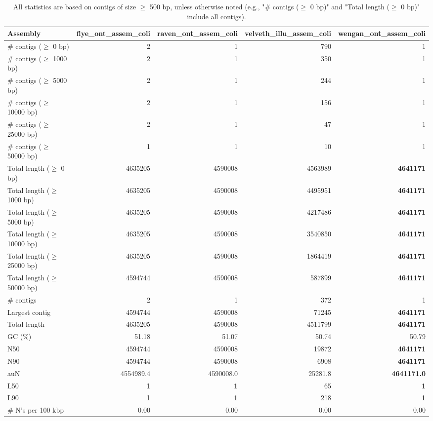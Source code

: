 \documentclass[12pt,a4paper]{article}
\begin{document}
\begin{table}[ht]
\begin{center}
\caption{All statistics are based on contigs of size $\geq$ 500 bp, unless otherwise noted (e.g., "\# contigs ($\geq$ 0 bp)" and "Total length ($\geq$ 0 bp)" include all contigs).}
\begin{tabular}{|l*{4}{|r}|}
\hline
Assembly & flye\_ont\_assem\_coli & raven\_ont\_assem\_coli & velveth\_illu\_assem\_coli & wengan\_ont\_assem\_coli \\ \hline
\# contigs ($\geq$ 0 bp) & 2 & 1 & 790 & 1 \\ \hline
\# contigs ($\geq$ 1000 bp) & 2 & 1 & 350 & 1 \\ \hline
\# contigs ($\geq$ 5000 bp) & 2 & 1 & 244 & 1 \\ \hline
\# contigs ($\geq$ 10000 bp) & 2 & 1 & 156 & 1 \\ \hline
\# contigs ($\geq$ 25000 bp) & 2 & 1 & 47 & 1 \\ \hline
\# contigs ($\geq$ 50000 bp) & 1 & 1 & 10 & 1 \\ \hline
Total length ($\geq$ 0 bp) & 4635205 & 4590008 & 4563989 & {\bf 4641171} \\ \hline
Total length ($\geq$ 1000 bp) & 4635205 & 4590008 & 4495951 & {\bf 4641171} \\ \hline
Total length ($\geq$ 5000 bp) & 4635205 & 4590008 & 4217486 & {\bf 4641171} \\ \hline
Total length ($\geq$ 10000 bp) & 4635205 & 4590008 & 3540850 & {\bf 4641171} \\ \hline
Total length ($\geq$ 25000 bp) & 4635205 & 4590008 & 1864419 & {\bf 4641171} \\ \hline
Total length ($\geq$ 50000 bp) & 4594744 & 4590008 & 587899 & {\bf 4641171} \\ \hline
\# contigs & 2 & 1 & 372 & 1 \\ \hline
Largest contig & 4594744 & 4590008 & 71245 & {\bf 4641171} \\ \hline
Total length & 4635205 & 4590008 & 4511799 & {\bf 4641171} \\ \hline
GC (\%) & 51.18 & 51.07 & 50.74 & 50.79 \\ \hline
N50 & 4594744 & 4590008 & 19872 & {\bf 4641171} \\ \hline
N90 & 4594744 & 4590008 & 6908 & {\bf 4641171} \\ \hline
auN & 4554989.4 & 4590008.0 & 25281.8 & {\bf 4641171.0} \\ \hline
L50 & {\bf 1} & {\bf 1} & 65 & {\bf 1} \\ \hline
L90 & {\bf 1} & {\bf 1} & 218 & {\bf 1} \\ \hline
\# N's per 100 kbp & 0.00 & 0.00 & 0.00 & 0.00 \\ \hline
\end{tabular}
\end{center}
\end{table}
\end{document}
